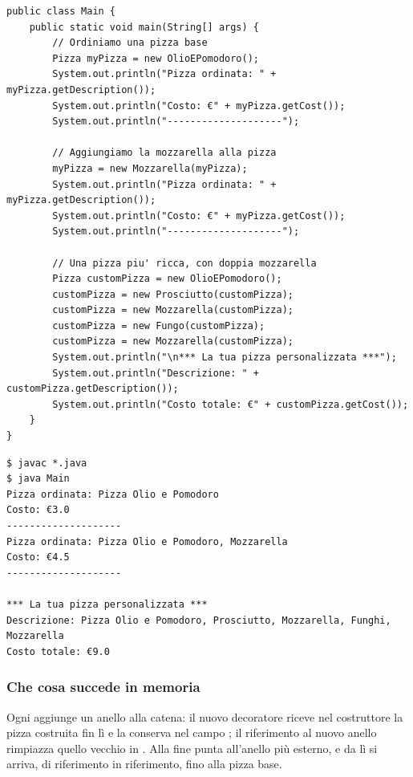 \begin{lstlisting}[style=java, name=Main.java]
public class Main {
    public static void main(String[] args) {
        // Ordiniamo una pizza base
        Pizza myPizza = new OlioEPomodoro();
        System.out.println("Pizza ordinata: " + myPizza.getDescription());
        System.out.println("Costo: €" + myPizza.getCost());
        System.out.println("--------------------");

        // Aggiungiamo la mozzarella alla pizza
        myPizza = new Mozzarella(myPizza);
        System.out.println("Pizza ordinata: " + myPizza.getDescription());
        System.out.println("Costo: €" + myPizza.getCost());
        System.out.println("--------------------");

        // Una pizza piu' ricca, con doppia mozzarella
        Pizza customPizza = new OlioEPomodoro();
        customPizza = new Prosciutto(customPizza);
        customPizza = new Mozzarella(customPizza);
        customPizza = new Fungo(customPizza);
        customPizza = new Mozzarella(customPizza);
        System.out.println("\n*** La tua pizza personalizzata ***");
        System.out.println("Descrizione: " + customPizza.getDescription());
        System.out.println("Costo totale: €" + customPizza.getCost());
    }
}
\end{lstlisting}
\begin{lstlisting}[style=shell, name=Terminale]
$ javac *.java
$ java Main
Pizza ordinata: Pizza Olio e Pomodoro
Costo: €3.0
--------------------
Pizza ordinata: Pizza Olio e Pomodoro, Mozzarella
Costo: €4.5
--------------------

*** La tua pizza personalizzata ***
Descrizione: Pizza Olio e Pomodoro, Prosciutto, Mozzarella, Funghi, Mozzarella
Costo totale: €9.0
\end{lstlisting}

\subsubsection*{Che cosa succede in memoria}

Ogni  aggiunge un anello alla catena: il nuovo decoratore riceve nel costruttore la pizza costruita fin lì e la
conserva nel campo ; il riferimento al nuovo anello rimpiazza quello vecchio in . Alla fine
 punta all'anello più esterno, e da lì si arriva, di riferimento in riferimento, fino alla pizza base.

